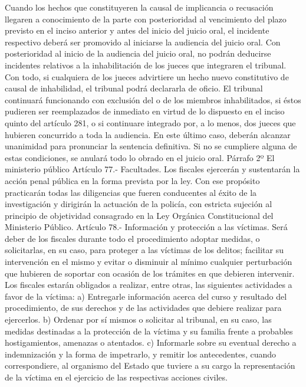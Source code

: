     Cuando los hechos que constituyeren la causal de implicancia o recusación llegaren a conocimiento de la parte con posterioridad al vencimiento del plazo previsto en el inciso anterior y antes del inicio del juicio oral, el incidente respectivo deberá ser promovido al iniciarse la audiencia del juicio oral.
    Con posterioridad al inicio de la audiencia del juicio oral, no podrán deducirse incidentes relativos a la inhabilitación de los jueces que integraren el tribunal. Con todo, si cualquiera de los jueces advirtiere un hecho nuevo constitutivo de causal de inhabilidad, el tribunal podrá declararla de oficio.
    El tribunal continuará funcionando con exclusión del o de los miembros inhabilitados, si éstos pudieren ser reemplazados de inmediato en virtud de lo dispuesto en el inciso quinto del artículo 281, o si continuare integrado por, a lo menos, dos jueces que hubieren concurrido a toda la audiencia. En este último caso, deberán alcanzar unanimidad para pronunciar la sentencia definitiva. Si no se cumpliere alguna de estas condiciones, se anulará todo lo obrado en el juicio oral.
    Párrafo 2º El ministerio público
    Artículo 77.- Facultades. Los fiscales ejercerán y sustentarán la acción penal pública en la forma prevista por la ley. Con ese propósito practicarán todas las diligencias que fueren conducentes al éxito de la investigación y dirigirán la actuación de la policía, con estricta sujeción al principio de objetividad consagrado en la Ley Orgánica Constitucional del Ministerio Público.
    Artículo 78.- Información y protección a las víctimas. Será deber de los fiscales durante todo el procedimiento adoptar medidas, o solicitarlas, en su caso, para proteger a las víctimas de los delitos; facilitar su intervención en el mismo y evitar o disminuir al mínimo cualquier perturbación que hubieren de soportar con ocasión de los trámites en que debieren intervenir.
    Los fiscales estarán obligados a realizar, entre otras, las siguientes actividades a favor de la víctima:
    a) Entregarle información acerca del curso y resultado del procedimiento, de sus derechos y de las actividades que debiere realizar para ejercerlos.
    b) Ordenar por sí mismos o solicitar al tribunal, en su caso, las medidas destinadas a la protección de la víctima y su familia frente a probables hostigamientos, amenazas o atentados.
    c) Informarle sobre su eventual derecho a indemnización y la forma de impetrarlo, y remitir los antecedentes, cuando correspondiere, al organismo del Estado que tuviere a su cargo la representación de la víctima en el ejercicio de las respectivas acciones civiles.

